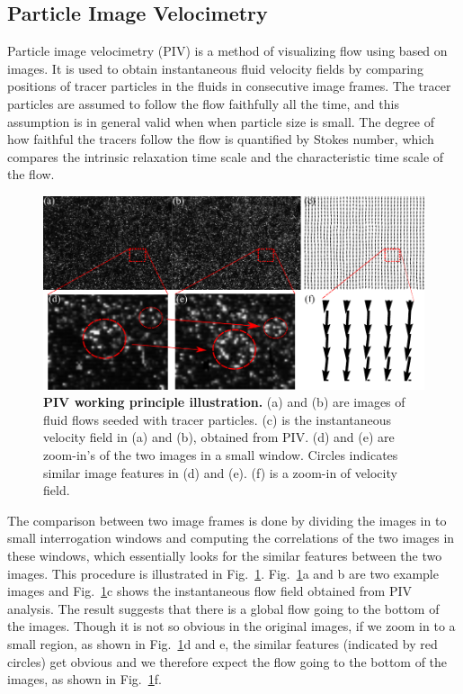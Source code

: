 \subsection{Particle Image Velocimetry }
Particle image velocimetry (PIV) is a method of visualizing flow using based on images. It is used to obtain instantaneous fluid velocity fields by comparing positions of tracer particles in the fluids in consecutive image frames. The tracer particles are assumed to follow the flow faithfully all the time, and this assumption is in general valid when when particle size is small. The degree of how faithful the tracers follow the flow is quantified by Stokes number, which compares the intrinsic relaxation time scale and the characteristic time scale of the flow.

\begin{figure}[!ht]
	\begin{center}
	\includegraphics[width=5.5in]{Figs/2-Exp/PIV.pdf}
	\end{center}
	\caption[PIV working principle illustration]
	{
	\textbf{PIV working principle illustration.}
	(a) and (b) are images of fluid flows seeded with tracer particles. (c) is the instantaneous velocity field in (a) and (b), obtained from PIV. (d) and (e) are zoom-in's of the two images in a small window. Circles indicates similar image features in (d) and (e). (f) is a zoom-in of velocity field.
	}
	\label{fig:PIV}
\end{figure}


The comparison between two image frames is done by dividing the images in to small interrogation windows and computing the correlations of the two images in these windows, which essentially looks for the similar features between the two images. This procedure is illustrated in Fig.~\ref{fig:PIV}. Fig.~\ref{fig:PIV}a and b are two example images and Fig.~\ref{fig:PIV}c shows the instantaneous flow field obtained from PIV analysis. The result suggests that there is a global flow going to the bottom of the images. Though it is not so obvious in the original images, if we zoom in to a small region, as shown in Fig.~\ref{fig:PIV}d and e, the similar features (indicated by red circles) get obvious and we therefore expect the flow going to the bottom of the images, as shown in Fig.~\ref{fig:PIV}f.

